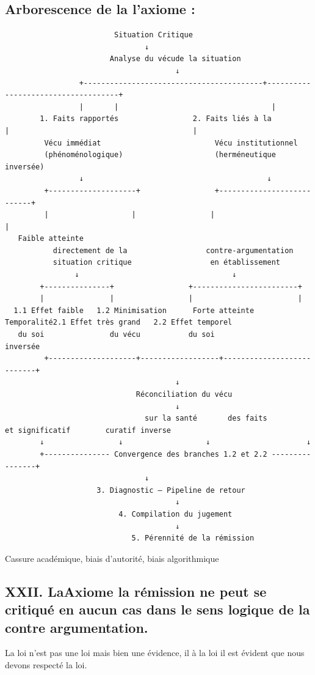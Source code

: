 \documentclass[12pt,a4paper]{article}
\begin{document}
\subsection*{Arborescence de la l’axiome :}
\begin{verbatim}
                         Situation Critique
                                ↓
                        Analyse du vécude la situation
                                       ↓
                 +-----------------------------------------+------------------------------------+
                 |       |                                   |
        1. Faits rapportés                 2. Faits liés à la                 |                                          |
         Vécu immédiat                          Vécu institutionnel
         (phénoménologique)                     (herméneutique inversée)
                 ↓                                          ↓
         +--------------------+                 +---------------------------+
         |                   |                 |                          |
   Faible atteinte
           directement de la                  contre‑argumentation
           situation critique                  en établissement
                ↓                                   ↓
        +---------------+                 +------------------------+
        |               |                 |                        |
  1.1 Effet faible   1.2 Minimisation      Forte atteinte           Temporalité2.1 Effet très grand   2.2 Effet temporel
   du soi               du vécu           du soi                   inversée
         +--------------------+------------------+---------------------------+
                                       ↓
                              Réconciliation du vécu
                                       ↓
                                sur la santé       des faits           et significatif        curatif inverse
        ↓                 ↓                   ↓                      ↓
        +--------------- Convergence des branches 1.2 et 2.2 ----------------+
                                ↓
                     3. Diagnostic — Pipeline de retour
                                       ↓
                          4. Compilation du jugement
                                       ↓
                             5. Pérennité de la rémission
\end{verbatim}

Cassure académique, biais d’autorité, biais algorithmique

\subsection*{XXII. LaAxiome la rémission ne peut se critiqué en aucun cas dans le sens logique de la contre argumentation.}
La loi n’est pas une loi mais bien une évidence, il à la loi il est évident que nous devons respecté la loi.
\end{document}

